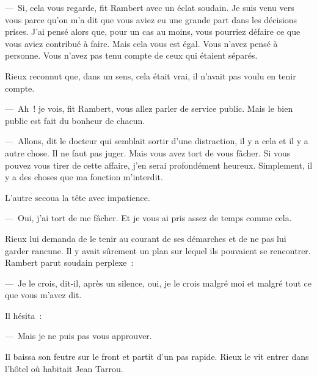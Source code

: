 \documentclass[french,twoside]{book} %
\begin{document}
— Si, cela vous regarde, fit Rambert avec un éclat soudain. Je suis venu vers vous parce qu’on m’a dit que vous aviez eu une grande part dans les décisions prises. J’ai pensé alors que, pour un cas au moins, vous pourriez défaire ce que vous aviez contribué à faire. Mais cela vous est égal. Vous n’avez pensé à personne. Vous n’avez pas tenu compte de ceux qui étaient séparés.\par
Rieux reconnut que, dans un sens, cela était vrai, il n’avait pas voulu en tenir compte.\par
— Ah ! je vois, fit Rambert, vous allez parler de service public. Mais le bien public est fait du bonheur de chacun.\par
— Allons, dit le docteur qui semblait sortir d’une distraction, il y a cela et il y a autre chose. Il ne faut pas juger. Mais vous avez tort de vous fâcher. Si vous pouvez vous tirer de cette affaire, j’en serai profondément heureux. Simplement, il y a des choses que ma fonction m’interdit.\par
L’autre secoua la tête avec impatience.\par
— Oui, j’ai tort de me fâcher. Et je vous ai pris assez de temps comme cela.\par
Rieux lui demanda de le tenir au courant de ses démarches et de ne pas lui garder rancune. Il y avait sûrement un plan sur lequel ils pouvaient se rencontrer. Rambert parut soudain perplexe :\par
— Je le crois, dit-il, après un silence, oui, je le crois malgré moi et malgré tout ce que vous m’avez dit.\par
Il hésita :\par
— Mais je ne puis pas vous approuver.\par
Il baissa son feutre sur le front et partit d’un pas rapide. Rieux le vit entrer dans l’hôtel où habitait Jean Tarrou.\par
\end{document}
